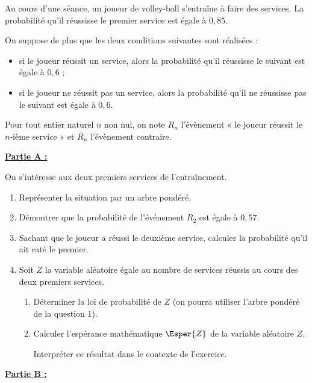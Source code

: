 Au cours d’une séance, un joueur de volley-ball s’entraîne à faire des services. La probabilité qu’il réussisse le premier service est égale à $0,85$.

\smallskip

On suppose de plus que les deux conditions suivantes sont réalisées :

\begin{itemize}
	\item si le joueur réussit un service, alors la probabilité qu’il réussisse le suivant est égale à $0,6$ ;
	\item si le joueur ne réussit pas un service, alors la probabilité qu’il ne réussisse pas le suivant est égale à $0,6$.
\end{itemize}

Pour tout entier naturel $n$ non nul, on note $R_n$ l’évènement « le joueur réussit le $n$-ième service » et $\overline{R_n}$ l’évènement contraire.

\bigskip

\textbf{\underline{Partie A :}}

\medskip

On s’intéresse aux deux premiers services de l’entraînement.

\begin{enumerate}
	\item Représenter la situation par un arbre pondéré.
	\item Démontrer que la probabilité de l’événement $R_2$ est égale à $0,57$.
	\item Sachant que le joueur a réussi le deuxième service, calculer la probabilité qu’il ait raté le premier.
	\item Soit $Z$ la variable aléatoire égale au nombre de services réussis au cours des deux premiers services.
	\begin{enumerate}
		\item  Déterminer la loi de probabilité de $Z$ (on pourra utiliser l’arbre pondéré de la question 1).
		\item Calculer l’espérance mathématique $\Esper{Z}$ de la variable aléatoire $Z$.
		
		Interpréter ce résultat dans le contexte de l’exercice.
	\end{enumerate}
\end{enumerate}

\smallskip

\textbf{\underline{Partie B :}}

\medskip

